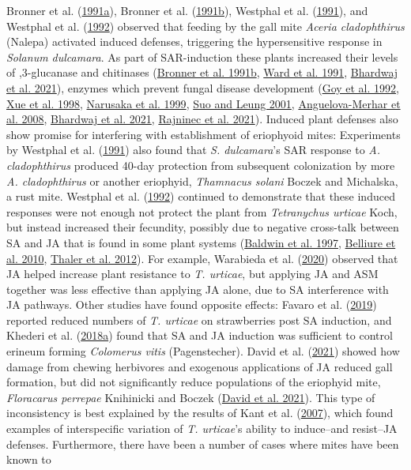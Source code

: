 \documentclass{ufdissertation}[overrideChapters] %
\begin{document}
{Bronner et al. (\protect\hyperlink{ref-Bronner1991}{1991a}), Bronner et al. (\protect\hyperlink{ref-Bronner1991a}{1991b}), Westphal et al. (\protect\hyperlink{ref-Westphal1991}{1991}), and Westphal et al. (\protect\hyperlink{ref-Westphal1992}{1992}) observed that feeding by the gall mite \emph{Aceria cladophthirus} (Nalepa) activated induced defenses, triggering the hypersensitive response in \emph{Solanum dulcamara}. As part of SAR-induction these plants increased their levels of ,3-glucanase and chitinases (\protect\hyperlink{ref-Bronner1991a}{Bronner et al. 1991b}, \protect\hyperlink{ref-Ward1991a}{Ward et al. 1991}, \protect\hyperlink{ref-Bhardwaj2021}{Bhardwaj et al. 2021}), enzymes which prevent fungal disease development (\protect\hyperlink{ref-Goy1992}{Goy et al. 1992}, \protect\hyperlink{ref-Xue1998}{Xue et al. 1998}, \protect\hyperlink{ref-Narusaka1999}{Narusaka et al. 1999}, \protect\hyperlink{ref-Suo2001}{Suo and Leung 2001}, \protect\hyperlink{ref-AnguelovaMerhar2008}{Anguelova-Merhar et al. 2008}, \protect\hyperlink{ref-Bhardwaj2021}{Bhardwaj et al. 2021}, \protect\hyperlink{ref-Rajninec2021}{Rajninec et al. 2021}). Induced plant defenses also show promise for interfering with establishment of eriophyoid mites: Experiments by Westphal et al. (\protect\hyperlink{ref-Westphal1991}{1991}) also found that \emph{S. dulcamara}'s SAR response to \emph{A. cladophthirus} produced 40-day protection from subsequent colonization by more \emph{A. cladophthirus} or another eriophyid, \emph{Thamnacus solani} Boczek and Michalska, a rust mite. Westphal et al. (\protect\hyperlink{ref-Westphal1992}{1992}) continued to demonstrate that these induced responses were not enough not protect the plant from \emph{Tetranychus urticae} Koch, but instead increased their fecundity, possibly due to negative cross-talk between SA and JA that is found in some plant systems (\protect\hyperlink{ref-Baldwin1997}{Baldwin et al. 1997}, \protect\hyperlink{ref-Belliure2010}{Belliure et al. 2010}, \protect\hyperlink{ref-Thaler2012}{Thaler et al. 2012}). For example, Warabieda et al. (\protect\hyperlink{ref-Warabieda2020}{2020}) observed that JA helped increase plant resistance to \emph{T. urticae}, but applying JA and ASM together was less effective than applying JA alone, due to SA interference with JA pathways. Other studies have found opposite effects: Favaro et al. (\protect\hyperlink{ref-Favaro2019}{2019}) reported reduced numbers of \emph{T. urticae} on strawberries post SA induction, and Khederi et al. (\protect\hyperlink{ref-Khederi2018}{2018a}) found that SA and JA induction was sufficient to control erineum forming \emph{Colomerus vitis} (Pagenstecher). David et al. (\protect\hyperlink{ref-David2021}{2021}) showed how damage from chewing herbivores and exogenous applications of JA reduced gall formation, but did not significantly reduce populations of the eriophyid mite, \emph{Floracarus perrepae} Knihinicki and Boczek (\protect\hyperlink{ref-David2021}{David et al. 2021}). This type of inconsistency is best explained by the results of Kant et al. (\protect\hyperlink{ref-Kant2007}{2007}), which found examples of interspecific variation of \emph{T. urticae}'s ability to induce--and resist--JA defenses. Furthermore, there have been a number of cases where mites have been known to }
\end{document}
